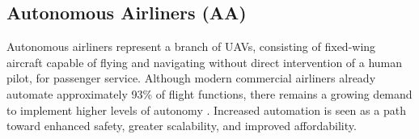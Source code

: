 \subsection{Autonomous Airliners (AA)}

Autonomous airliners represent a branch of \glspl{UAV}, consisting of fixed-wing aircraft capable of flying and navigating without direct intervention of a human pilot, for passenger service.
Although modern commercial airliners already automate approximately 93\% of flight functions, there remains a growing demand to implement higher levels of autonomy  \cite{Vance_2019}.
Increased automation is seen as a path toward enhanced safety, greater scalability, and improved affordability.
